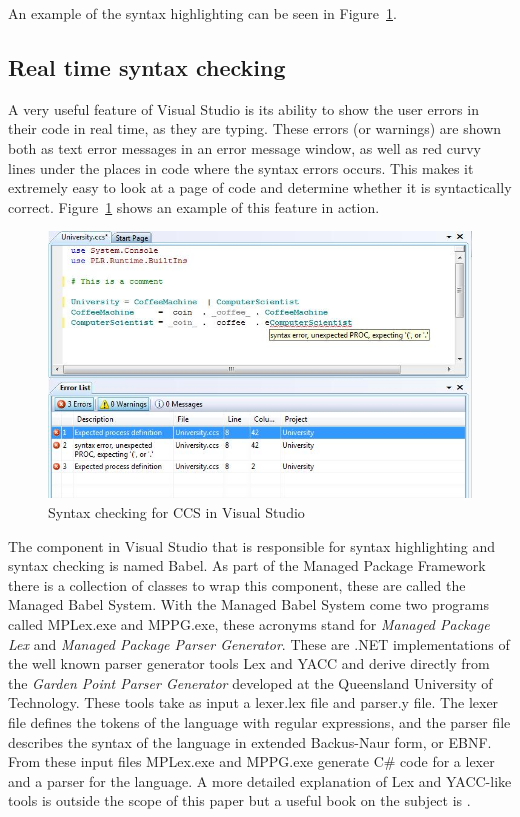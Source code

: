 	An example of the syntax highlighting can be seen in 
	Figure~\ref{fig:syntaxcheck}.
	
	\subsection{Real time syntax checking}\label{sec:syntax_checking}
	A very useful feature of Visual Studio is its ability to show the user 
	errors in their code in real time, as they are typing. These errors (or 
	warnings) are shown both as text error messages in an error message window, 
	as well as red curvy lines under the places in code where the syntax errors 
	occurs. This makes it extremely easy to look at a page of code and determine 
	whether it is syntactically correct. Figure~\ref{fig:syntaxcheck} shows an 
	example of this feature in action.
	
	\begin{figure}[h!]
		\centering
		\includegraphics[scale=0.7]{syntaxcheck.jpg}
		\caption{Syntax checking for CCS in Visual Studio}
		\label{fig:syntaxcheck}
	\end{figure}

	The component in Visual Studio that is responsible for syntax highlighting 
	and syntax checking is named Babel. As part of the Managed Package Framework 
	there is a collection of classes to wrap this component, these are called 
	the Managed Babel System. With the Managed Babel System come two programs 
	called MPLex.exe and MPPG.exe, these acronyms stand for \textit{Managed 
	Package Lex} and \textit{Managed Package Parser Generator}. These are .NET 
	implementations of the well known parser generator tools Lex and YACC and 
	derive directly from the \textit{Garden Point Parser Generator} \cite{gppg} 
	developed at the Queensland University of Technology. These tools take as 
	input a \textsf{lexer.lex} file and \textsf{parser.y} file. The lexer file 
	defines the tokens of the language with regular expressions, and the parser 
	file describes the syntax of the language in extended Backus-Naur form, or 
	EBNF. From these input files MPLex.exe and MPPG.exe generate C\# code for a 
	lexer and a parser for the language. A more detailed explanation of Lex and 
	YACC-like tools is outside the scope of this paper but a useful book on the 
	subject is \cite{lexyacc}. 
	
